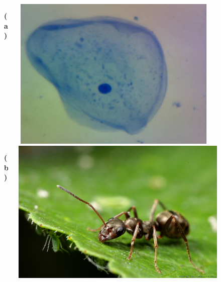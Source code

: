 \begin{figure}
 \centering
  \begin{columns}
  \begin{column}{0.10\textwidth}
   \textbf{(a)}
  \end{column}
  \begin{column}{0.65\textwidth}
    \includegraphics[width=\textwidth]{img/cheek_cell}
  \end{column}
  \begin{column}{0.05\textwidth}
    \cite{clare_and_ben_2017}
  \end{column}
  \end{columns}
  \begin{columns}
  \begin{column}{0.10\textwidth}
   \textbf{(b)}
  \end{column}
  \begin{column}{0.65\textwidth}
    \includegraphics[width=\textwidth]{img/ant}

\end{column}
\end{columns}
\end{figure}
